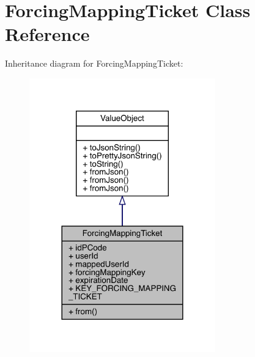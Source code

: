 \hypertarget{classcom_1_1toast_1_1android_1_1gamebase_1_1auth_1_1mapping_1_1data_1_1_forcing_mapping_ticket}{}\section{Forcing\+Mapping\+Ticket Class Reference}
\label{classcom_1_1toast_1_1android_1_1gamebase_1_1auth_1_1mapping_1_1data_1_1_forcing_mapping_ticket}


Inheritance diagram for Forcing\+Mapping\+Ticket\+:
\nopagebreak
\begin{figure}[H]
\begin{center}
\leavevmode
\includegraphics[width=228pt]{classcom_1_1toast_1_1android_1_1gamebase_1_1auth_1_1mapping_1_1data_1_1_forcing_mapping_ticket__inherit__graph}
\end{center}
\end{figure}


